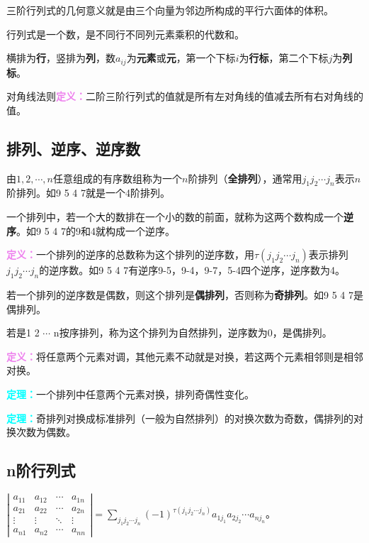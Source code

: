 \documentclass[UTF8, 12pt]{ctexart}
\begin{document}
    三阶行列式的几何意义就是由三个向量为邻边所构成的平行六面体的体积。

    行列式是一个数，是不同行不同列元素乘积的代数和。

    横排为\textbf{行}，竖排为\textbf{列}，数$a_{ij}$为\textbf{元素}或\textbf{元}，第一个下标$i$为\textbf{行标}，第二个下标$j$为\textbf{列标}。

    对角线法则\textcolor{violet}{\textbf{定义：}}二阶三阶行列式的值就是所有左对角线的值减去所有右对角线的值。

    \subsection{排列、逆序、逆序数}

    由$1,2,\cdots,n$任意组成的有序数组称为一个$n$阶排列（\textbf{全排列}），通常用$j_1j_2\cdots j_n$表示$n$阶排列。如9 5 4 7就是一个4阶排列。

    一个排列中，若一个大的数排在一个小的数的前面，就称为这两个数构成一个\textbf{逆序}。如9 5 4 7的9和4就构成一个逆序。

    \textcolor{violet}{\textbf{定义：}}一个排列的逆序的总数称为这个排列的逆序数，用$\tau(j_1j_2\cdots j_n)$表示排列$j_1j_2\cdots j_n$的逆序数。如9 5 4 7有逆序9-5，9-4，9-7，5-4四个逆序，逆序数为4。

    若一个排列的逆序数是偶数，则这个排列是\textbf{偶排列}，否则称为\textbf{奇排列}。如9 5 4 7是偶排列。

    若是1 2 $\cdots$ n按序排列，称为这个排列为自然排列，逆序数为0，是偶排列。

    \textcolor{violet}{\textbf{定义：}}将任意两个元素对调，其他元素不动就是对换，若这两个元素相邻则是相邻对换。

    \textcolor{aqua}{\textbf{定理：}}一个排列中任意两个元素对换，排列奇偶性变化。

    \textcolor{aqua}{\textbf{定理：}}奇排列对换成标准排列（一般为自然排列）的对换次数为奇数，偶排列的对换次数为偶数。

    \subsection{n阶行列式}

    $
    \left|\begin{array}{cccc}
              a_{11} & a_{12} & \cdots & a_{1n} \\
              a_{21} & a_{22} & \cdots & a_{2n} \\
              \vdots & \vdots & \ddots & \vdots \\
              a_{n1} & a_{n2} & \cdots & a_{nn}
    \end{array}\right|
    =\sum\limits_{j_1j_2\cdots j_n}(-1)^{\tau(j_1j_2\cdots j_n)}a_{1j_1}a_{2j_2}\cdots a_{nj_n}$。
\end{document}
